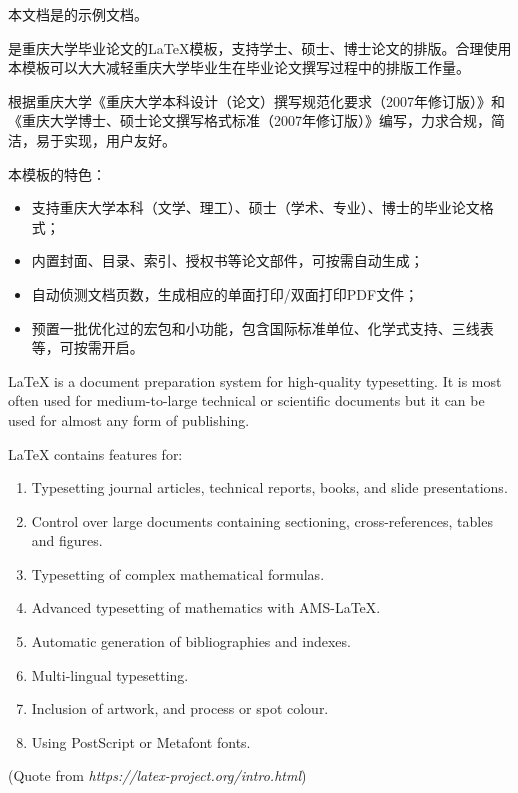 \begin{cabstract}	%
	本文档是\cquthesis{}的示例文档。
		
	\cquthesis{}是重庆大学毕业论文的\LaTeX{}模板，支持学士、硕士、博士论文的排版。合理使用本模板可以大大减轻重庆大学毕业生在毕业论文撰写过程中的排版工作量。
	
	\cquthesis{}根据重庆大学《重庆大学本科设计（论文）撰写规范化要求（2007年修订版）》和《重庆大学博士、硕士论文撰写格式标准（2007年修订版）》编写，力求合规，简洁，易于实现，用户友好。
	
	本模板的特色：
  \begin{itemize}
  	\item 支持重庆大学本科（文学、理工）、硕士（学术、专业）、博士的毕业论文格式；
  	\item 内置封面、目录、索引、授权书等论文部件，可按需自动生成；
  	\item 自动侦测文档页数，生成相应的单面打印/双面打印PDF文件；
  	\item 预置一批优化过的宏包和小功能，包含国际标准单位、化学式支持、三线表等，可按需开启。
  \end{itemize}
\end{cabstract}

\begin{eabstract}	%
	LaTeX is a document preparation system for high-quality typesetting. It is most often used for medium-to-large technical or scientific documents but it can be used for almost any form of publishing.
	
  LaTeX contains features for:
\begin{enumerate}
  	\item Typesetting journal articles, technical reports, books, and slide presentations.
  	\item Control over large documents containing sectioning, cross-references, tables and figures.
  	\item Typesetting of complex mathematical formulas.
  	\item Advanced typesetting of mathematics with AMS-LaTeX.
  	\item Automatic generation of bibliographies and indexes.
  	\item Multi-lingual typesetting.
  	\item Inclusion of artwork, and process or spot colour.
  	\item Using PostScript or Metafont fonts.
  \end{enumerate}
  (Quote from \textit{https://latex-project.org/intro.html})  
\end{eabstract}

